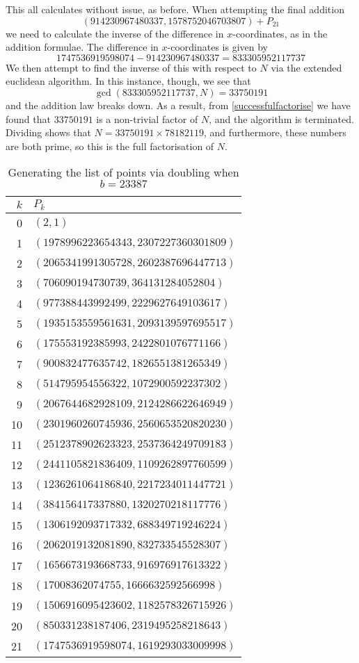This all calculates without issue, as before.
When attempting the final addition
$$(914230967480337, 1578752046703807) + P_{21}$$
we need to calculate the inverse of the difference in $x$-coordinates, as in the addition formulae.
The difference in $x$-coordinates is given by
$$1747536919598074 - 914230967480337 = 833305952117737$$
We then attempt to find the inverse of this with respect to $N$ via the extended euclidean algorithm.
In this instance, though, we see that
\begin{equation}
	\gcd(833305952117737, N) = 33750191
	\label{successfulfactorise}
\end{equation}
and the addition law breaks down.
As a result, from \cref{successfulfactorise} we have found that $33750191$ is a non-trivial factor of $N$, and the algorithm is terminated.
Dividing shows that $N = 33750191 \times 78182119$, and furthermore, these numbers are both prime, so this is the full factorisation of $N$.
\begin{table}[htbp]
	\centering
	\begin{tabular}{r|l}
		$k$ & $P_k$\\
		\hline
		0 & $(2, 1)$\\
		1 & $(1978996223654343, 2307227360301809)$\\
		2 & $(2065341991305728, 2602387696447713)$\\
		3 & $(706090194730739, 364131284052804)$\\
		4 & $(977388443992499, 2229627649103617)$\\
		5 & $(1935153559561631, 2093139597695517)$\\
		6 & $(175553192385993, 2422801076771166)$\\
		7 & $(900832477635742, 1826551381265349)$\\
		8 & $(514795954556322, 1072900592237302)$\\
		9 & $(2067644682928109, 2124286622646949)$\\
		10 & $(2301960260745936, 2560653520820230)$\\
		11 & $(2512378902623323, 2537364249709183)$\\
		12 & $(2441105821836409, 1109262897760599)$\\
		13 & $(1236261064186840, 2217234011447721)$\\
		14 & $(384156417337880, 1320270218117776)$\\
		15 & $(1306192093717332, 688349719246224)$\\
		16 & $(2062019132081890, 832733545528307)$\\
		17 & $(1656673193668733, 916976917613322)$\\
		18 & $(17008362074755, 1666632592566998)$\\
		19 & $(1506916095423602, 1182578326715926)$\\
		20 & $(850331238187406, 2319495258218643)$\\
		21 & $(1747536919598074, 1619293033009998)$
	\end{tabular}
	\caption{Generating the list of points via doubling when $b=23387$}
	\label{successfuldouble}
\end{table}
